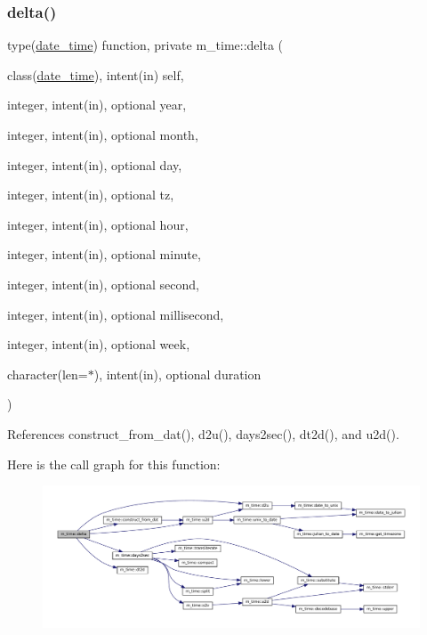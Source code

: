 \subsubsection{\texorpdfstring{delta()}{delta()}}
{\footnotesize\ttfamily type(\mbox{\hyperlink{structm__time_1_1date__time}{date\+\_\+time}}) function, private m\+\_\+time\+::delta (\begin{DoxyParamCaption}\item[{class(\mbox{\hyperlink{structm__time_1_1date__time}{date\+\_\+time}}), intent(in)}]{self,  }\item[{integer, intent(in), optional}]{year,  }\item[{integer, intent(in), optional}]{month,  }\item[{integer, intent(in), optional}]{day,  }\item[{integer, intent(in), optional}]{tz,  }\item[{integer, intent(in), optional}]{hour,  }\item[{integer, intent(in), optional}]{minute,  }\item[{integer, intent(in), optional}]{second,  }\item[{integer, intent(in), optional}]{millisecond,  }\item[{integer, intent(in), optional}]{week,  }\item[{character(len=$\ast$), intent(in), optional}]{duration }\end{DoxyParamCaption})\hspace{0.3cm}{\ttfamily [private]}}



References construct\+\_\+from\+\_\+dat(), d2u(), days2sec(), dt2d(), and u2d().

Here is the call graph for this function\+:\nopagebreak
\begin{figure}[H]
\begin{center}
\leavevmode
\includegraphics[width=350pt]{namespacem__time_aa623b1643e55ffbf97e4fbd1c7e8c379_cgraph}
\end{center}
\end{figure}
\mbox{\label{namespacem__time_adfda8a89820b8d0ad4581a14896e4ce5}} 
